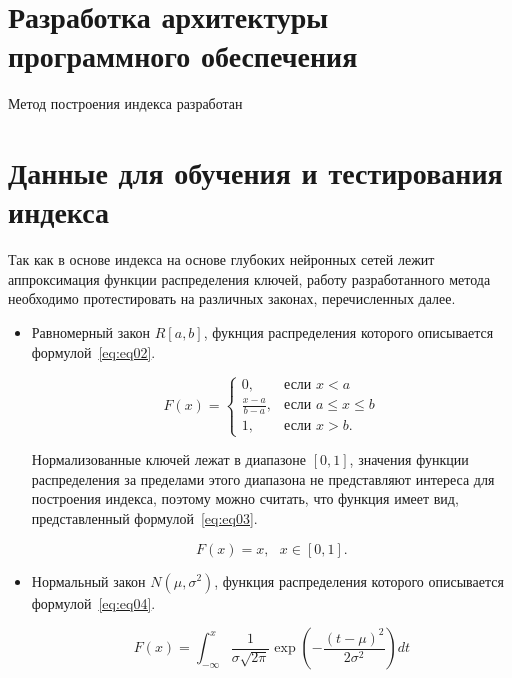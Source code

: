 \section{Разработка архитектуры программного обеспечения}

Метод построения индекса разработан

\section{Данные для обучения и тестирования индекса}

Так как в основе индекса на основе глубоких нейронных сетей лежит аппроксимация
функции распределения ключей, работу разработанного метода необходимо
протестировать на различных законах, перечисленных далее.

\begin{itemize}
    \item Равномерный закон $R[a,b]$, фукнция распределения которого описывается
        формулой~\ref{eq:eq02}.

        \begin{equation}\label{eq:eq02}
            F(x) = \begin{cases}
                0, & \text{если } x < a \\
                \frac{x - a}{b - a}, & \text{если } a \leq x \leq b \\
                1, & \text{если } x > b.
            \end{cases}
        \end{equation}

        Нормализованные ключей лежат в диапазоне $[0, 1]$, значения функции
        распределения за пределами этого диапазона не представляют интереса для
        построения индекса, поэтому можно считать, что функция имеет вид,
        представленный формулой~\ref{eq:eq03}.

        \begin{equation}\label{eq:eq03}
            F(x) = x, \text{  } x \in [0, 1].
        \end{equation}

    \item Нормальный закон $N(\mu, \sigma^2)$, функция распределения которого
        описывается формулой~\ref{eq:eq04}.

        \begin{equation}\label{eq:eq04}
            F(x) = \int_{-\infty}^{x} \frac{1}{{\sigma \sqrt{2\pi}}}
            \exp\left(-\frac{{(t - \mu)^2}}{{2\sigma^2}}\right) dt
        \end{equation}
\end{itemize}

